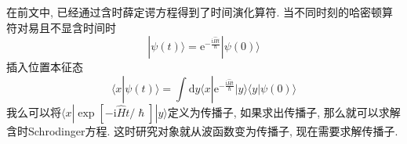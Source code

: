         在前文中, 已经通过含时薛定谔方程得到了时间演化算符. 当不同时刻的哈密顿算符对易且不显含时间时
        \begin{equation}
            | \psi(t) \rangle = \mathrm{e}^{-\frac {\mathrm{i}\hat{H}t}{\hslash}} | \psi(0) \rangle
        \end{equation}
        插入位置本征态
        \begin{equation}
            \langle x | \psi(t) \rangle = \int \mathrm{d} y \langle x | \mathrm{e}^{-\frac {\mathrm{i}\hat{H}t}{\hslash}} | y \rangle  \langle y | \psi(0) \rangle
        \end{equation}
        我么可以将$\langle x | \exp[-\mathrm{i}\hat{H}t / \hslash] | y \rangle$定义为传播子, 如果求出传播子, 那么就可以求解含时Schrodinger方程. 这时研究对象就从波函数变为传播子, 现在需要求解传播子. 

